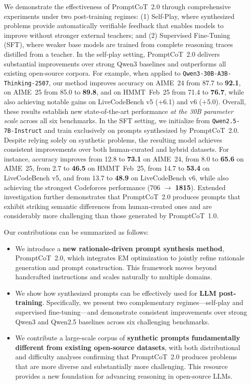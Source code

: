   
  We demonstrate the effectiveness of PromptCoT~2.0 through comprehensive experiments under two post-training regimes:  
  (1) Self-Play, where synthesized problems provide automatically verifiable feedback that enables models to improve without stronger external teachers; and  
  (2) Supervised Fine-Tuning (SFT), where weaker base models are trained from complete reasoning traces distilled from a teacher.  
  In the self-play setting, PromptCoT~2.0 delivers substantial improvements over strong Qwen3 baselines and outperforms all existing open-source corpora.  
  For example, when applied to \texttt{Qwen3-30B-A3B-Thinking-2507}, our method improves accuracy on AIME~24 from 87.7 to \textbf{92.1}, on AIME~25 from 85.0 to \textbf{89.8}, and on HMMT~Feb~25 from 71.4 to \textbf{76.7}, while also achieving notable gains on LiveCodeBench v5 (+6.1) and v6 (+5.0).  
  Overall, these results establish new state-of-the-art performance \emph{at the 30B parameter scale} across all six benchmarks.  
  In the SFT setting, we initialize from \texttt{Qwen2.5-7B-Instruct} and train exclusively on prompts synthesized by PromptCoT~2.0.  
  Despite relying solely on synthetic problems, the resulting model achieves consistent improvements over both human-curated and hybrid datasets.  
  For instance, accuracy improves from 12.8 to \textbf{73.1} on AIME~24, from 8.0 to \textbf{65.6} on AIME~25, from 2.7 to \textbf{46.5} on HMMT~Feb~25, from 14.7 to \textbf{53.4} on LiveCodeBench v5, and from 13.7 to \textbf{48.9} on LiveCodeBench v6, while also achieving the strongest Codeforces performance (706 $\to$ \textbf{1815}). Extended investigation further demonstrates that PromptCoT~2.0 produces prompts that exhibit striking semantic differences from human-created ones and are considerably more challenging than those generated by PromptCoT~1.0.
  
  Our contributions can be summarized as follows:
  \begin{itemize}
      \item We introduce a \textbf{new rationale-driven prompt synthesis method}, PromptCoT~2.0, which integrates EM optimization to jointly refine rationale generation and prompt construction. This framework moves beyond handcrafted instructions and scales naturally to multiple domains.
      \item We show how synthesized prompts can be effectively used for \textbf{LLM post-training}. Specifically, we present two complementary regimes—self-play and supervised fine-tuning—and demonstrate consistent improvements over strong Qwen3 and Qwen2.5 baselines across six challenging benchmarks.
      \item We contribute a large-scale corpus of \textbf{synthetic prompts fundamentally different from existing open-source datasets}, with both distributional and difficulty analyses confirming that PromptCoT~2.0 produces problems that are more diverse and substantially more challenging. This resource provides a new foundation for advancing reasoning in open-source LLMs.
  \end{itemize}
  
